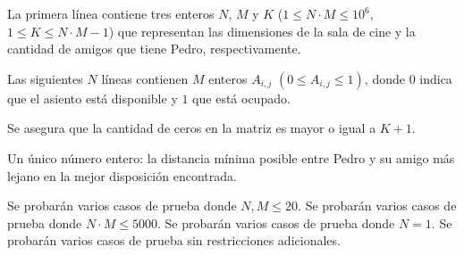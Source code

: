 \documentclass{oci}
\begin{document}
\begin{inputDescription}
La primera línea contiene tres enteros $N$, $M$ y $K$ ($1 \leq N \cdot M \leq 10^6$, $1 \leq K \leq N \cdot M - 1$) que representan las dimensiones de la sala de cine y la cantidad de amigos que tiene Pedro, respectivamente.

Las siguientes $N$ líneas contienen $M$ enteros $A_{i,j}$ $(0 \leq A_{i,j} \leq 1)$, donde $0$ indica que el asiento está disponible y $1$ que está ocupado.

Se asegura que la cantidad de ceros en la matriz es mayor o igual a $K+1$.
\end{inputDescription}

\begin{outputDescription}
Un único número entero: la distancia mínima posible entre Pedro y su amigo más lejano en la mejor disposición encontrada.
\end{outputDescription}

\begin{scoreDescription}
\subtask{} Se probarán varios casos de prueba donde $N, M \leq 20$.
  \subtask{} Se probarán varios casos de prueba donde $N \cdot M \leq 5000$.
  \subtask{} Se probarán varios casos de prueba donde $N = 1$.
  \subtask{} Se probarán varios casos de prueba sin restricciones adicionales.
\end{scoreDescription}

\begin{sampleDescription}
\end{sampleDescription}
\end{document}
